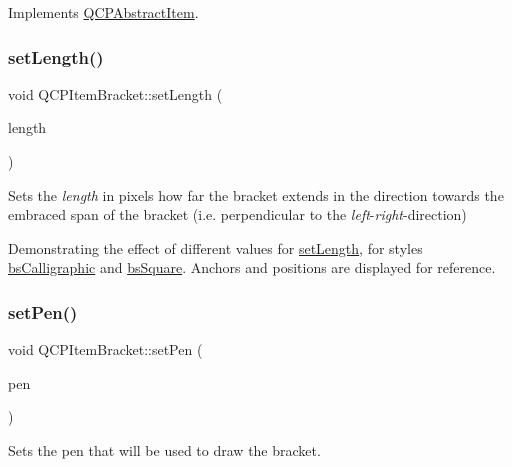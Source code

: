 Implements \hyperlink{class_q_c_p_abstract_item_ae41d0349d68bb802c49104afd100ba2a}{Q\+C\+P\+Abstract\+Item}.

\mbox{\label{class_q_c_p_item_bracket_ac7cfc3da7da9b5c5ac5dfbe4f0351b2a}} 
\subsubsection{\texorpdfstring{set\+Length()}{setLength()}}
{\footnotesize\ttfamily void Q\+C\+P\+Item\+Bracket\+::set\+Length (\begin{DoxyParamCaption}\item[{double}]{length }\end{DoxyParamCaption})}

Sets the {\itshape length} in pixels how far the bracket extends in the direction towards the embraced span of the bracket (i.\+e. perpendicular to the {\itshape left}-\/{\itshape right}-\/direction)

 \begin{center}Demonstrating the effect of different values for \hyperlink{class_q_c_p_item_bracket_ac7cfc3da7da9b5c5ac5dfbe4f0351b2a}{set\+Length}, for styles \hyperlink{class_q_c_p_item_bracket_a7ac3afd0b24a607054e7212047d59dbda8f29f5ef754e2dc9a9efdedb2face0f3}{bs\+Calligraphic} and \hyperlink{class_q_c_p_item_bracket_a7ac3afd0b24a607054e7212047d59dbda7f9df4a7359bfe3dac1dbe4ccf5d220c}{bs\+Square}. Anchors and positions are displayed for reference.\end{center}  \mbox{\label{class_q_c_p_item_bracket_ab13001d9cc5d8f9e56ea15bdda682acb}} 
\subsubsection{\texorpdfstring{set\+Pen()}{setPen()}}
{\footnotesize\ttfamily void Q\+C\+P\+Item\+Bracket\+::set\+Pen (\begin{DoxyParamCaption}\item[{const Q\+Pen \&}]{pen }\end{DoxyParamCaption})}

Sets the pen that will be used to draw the bracket.

